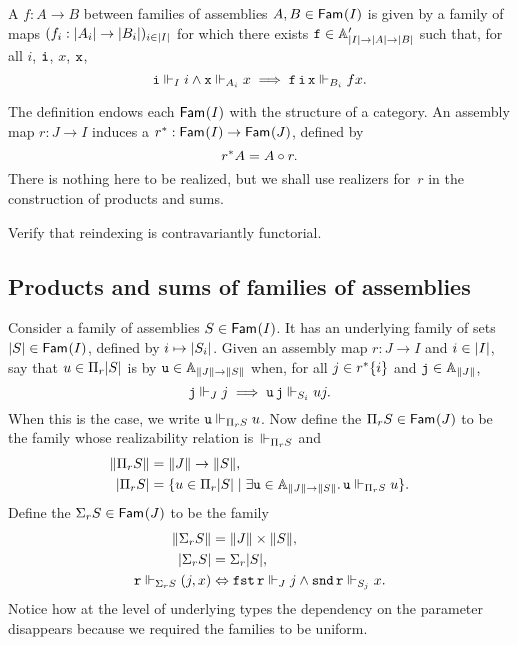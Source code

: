 \begin{definition}
  A  $f : A \to B$ between families of assemblies $A, B \in \Fam{I}$ is given by a family of maps $(f_i : \S{A_i} \to \S{B_i})_{i \in \S{I}}$
  for which there exists $\R{f} \in \subAtyp{\S{I} \to \S{A} \to \S{B}}$ such that,
  for all $i$, $\R{i}$, $x$, $\R{x}$,
  \begin{equation*}
    \R{i} \rz[I] i \land \R{x} \rz[A_i] x \implies \R{f}\,\R{i}\,\R{x} \rz[B_i] f x.
  \end{equation*}
\end{definition}

The definition endows each $\Fam{I}$ with the structure of a category.
%
An assembly map $r : J \to I$ induces a  $\invim{r} : \Fam{I} \to \Fam{J}$, defined by
%
\begin{equation*}
  \invim{r} A = A \circ r.
\end{equation*}
%
There is nothing here to be realized, but we shall use realizers for~$r$ in the construction of products and sums.

\begin{exercise}
  Verify that reindexing is contravariantly functorial.
\end{exercise}


\subsection{Products and sums of families of assemblies}
\label{sec:depend-sums-prod-asm}

Consider a family of assemblies $S \in \Fam{I}$. It has an underlying family of sets $\S{S} \in \Fam{I}$, defined by $i \mapsto \S{S_i}$. Given an assembly map $r : J \to I$
and $i \in \S{I}$, say that $u \in \Pi_r \S{S}$ is  by $\R{u} \in \Atyp{\T{J} \to \T{S}}$ when, for all $j \in \invim{r} \set{i}$ and $\R{j} \in \Atyp{\T{J}}$,
%
\begin{equation*}
  \R{j} \rz[J] j \implies
  \R{u}\,\R{j} \rz[S_i] u j.
\end{equation*}
%
When this is the case, we write $\R{u} \rz[\Pi_r S] u$.
%
Now define the  $\Pi_r S \in \Fam{J}$ to be the family whose realizability relation is~$\rz[\Pi_r S]$ and
%
\begin{align*}
  \T{\Pi_r S} &= \T{J} \to \T{S}, \\
  \S{\Pi_r S} &= 
    \set{ u \in \Pi_r \S{S} \such
       \some{\R{u} \in \Atyp{\T{J} \to \T{S}}} \R{u} \rz[\Pi_r S] u
    }.
\end{align*}
%
Define the  $\Sigma_r S \in \Fam{J}$ to be the family
%
\begin{align*}
  \T{\Sigma_r S} &= \T{J} \times \T{S}, \\
  \S{\Sigma_r S} &= \Sigma_r \S{S}, \\
  \R{r} \rz[\Sigma_r S] (j, x) &\liff
  \combFst\,\R{r} \rz[J] j \land \combSnd\,\R{r} \rz[S_j] x.
\end{align*}
%
Notice how at the level of underlying types the dependency on the
parameter disappears because we required the families to be
uniform.


